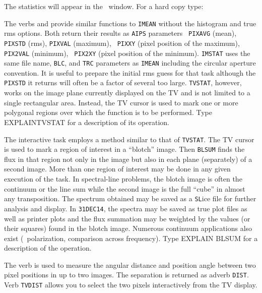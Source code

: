      The statistics will appear in the \AIPS\ window.  For a hard
copy type:
\pd

     The verbs {\tt {}} and {\tt {}} provide
similar functions to {\tt IMEAN} without the histogram and true rms
options.  Both return their results as {\tt AIPS} parameters {\tt
PIXAVG} (mean), {\tt PIXSTD} (rms), {\tt PIXVAL} (maximum), {\tt
PIXXY} (pixel position of the maximum), {\tt PIX2VAL} (minimum), {\tt
PIX2XY} (pixel position of the minimum).  {\tt IMSTAT} uses the same
file name, {\tt BLC}, and {\tt TRC} parameters as {\tt IMEAN}
including the circular aperture convention.  It is useful to prepare
the initial rms guess for that task although the {\tt PIXSTD} it
returns will often be a factor of several too large.  {\tt TVSTAT},
however, works on the image plane currently displayed on the TV and is
not limited to a single rectangular area.  Instead, the TV cursor is
used to mark one or more polygonal regions over which the function is
to be performed.  Type {\us EXPLAIN\qs TVSTAT \CR} for a description
of its operation.

     The interactive task {\tt {}} employs a method similar
to that of \hbox{{\tt TVSTAT}}.  The TV cursor is used to mark a
region of interest in a ``blotch'' image.  Then {\tt BLSUM} finds the
flux in that region not only in the  image but also in
each plane (separately) of a second image.  More than one region of
interest may be done in any given execution of the task.  In
spectral-line problems, the blotch image is often the continuum or the
line sum while the second image is the full ``cube'' in almost any
transposition.  The spectrum obtained may be saved as a {\tt SL}ice
file for further analysis and display.  In {\tt 31DEC14}, the spectra
may be saved as true plot files as well as printer plots and the flux
summation may be weighted by the values (or their squares) found in
the blotch image.  Numerous continuum applications also exist (\eg\
polarization, comparison across frequency).  Type {\us EXPLAIN\qs
BLSUM \CR} for a description of the operation.

     The verb {\tt {}} is used to measure the angular
distance and position angle between two pixel positions in up to two
images.  The separation is returned as adverb {\tt DIST}\@.  Verb
{\tt TVDIST} allows you to select the two pixels interactively from
the TV display.


